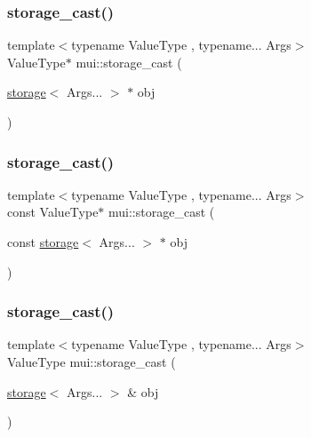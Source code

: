 \mbox{\label{namespacemui_a974c76ff15a66ba1d7dc371904cfd9c1}} 
\subsubsection{\texorpdfstring{storage\+\_\+cast()}{storage\_cast()}\hspace{0.1cm}{\footnotesize\ttfamily [1/5]}}
{\footnotesize\ttfamily template$<$typename Value\+Type , typename... Args$>$ \\
Value\+Type$\ast$ mui\+::storage\+\_\+cast (\begin{DoxyParamCaption}\item[{\hyperlink{structmui_1_1storage}{storage}$<$ Args... $>$ $\ast$}]{obj }\end{DoxyParamCaption})}

\mbox{\label{namespacemui_afe85913fc503e4aa1b084631ec523248}} 
\subsubsection{\texorpdfstring{storage\+\_\+cast()}{storage\_cast()}\hspace{0.1cm}{\footnotesize\ttfamily [2/5]}}
{\footnotesize\ttfamily template$<$typename Value\+Type , typename... Args$>$ \\
const Value\+Type$\ast$ mui\+::storage\+\_\+cast (\begin{DoxyParamCaption}\item[{const \hyperlink{structmui_1_1storage}{storage}$<$ Args... $>$ $\ast$}]{obj }\end{DoxyParamCaption})}

\mbox{\label{namespacemui_af0748816507e7dce73b3ffca9f5e2dc0}} 
\subsubsection{\texorpdfstring{storage\+\_\+cast()}{storage\_cast()}\hspace{0.1cm}{\footnotesize\ttfamily [3/5]}}
{\footnotesize\ttfamily template$<$typename Value\+Type , typename... Args$>$ \\
Value\+Type mui\+::storage\+\_\+cast (\begin{DoxyParamCaption}\item[{\hyperlink{structmui_1_1storage}{storage}$<$ Args... $>$ \&}]{obj }\end{DoxyParamCaption})}

